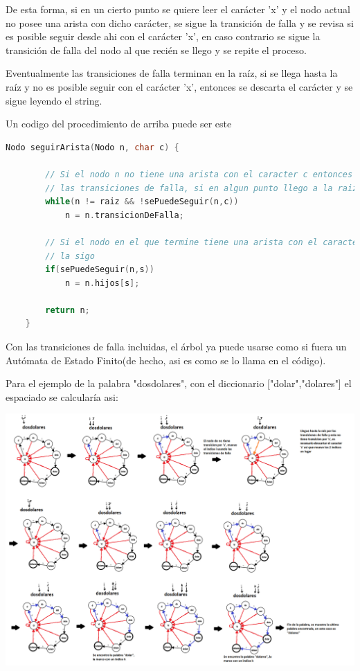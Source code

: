\documentclass{article}
\begin{document}
De esta forma, si en un cierto punto se quiere leer el carácter 'x' y el nodo actual no posee una arista con dicho carácter,
se sigue la transición de falla y se revisa si es posible seguir desde ahi con el carácter 'x', en caso contrario se sigue la transición de falla del nodo al que recién se llego y se repite el proceso.

Eventualmente las transiciones de falla terminan en la raíz, si se llega hasta la raíz y no es posible seguir con el carácter 'x', entonces se descarta el carácter y se sigue leyendo el string.

Un codigo del procedimiento de arriba puede ser este
\begin{lstlisting}[language=C]
    Nodo seguirArista(Nodo n, char c) {
        
        // Si el nodo n no tiene una arista con el caracter c entonces salto por
        // las transiciones de falla, si en algun punto llego a la raiz entonces paro.
        while(n != raiz && !sePuedeSeguir(n,c))
            n = n.transicionDeFalla;
        
        // Si el nodo en el que termine tiene una arista con el caracter s, entonces
        // la sigo
        if(sePuedeSeguir(n,s))
            n = n.hijos[s];
        
        return n;
    }
\end{lstlisting}

Con las transiciones de falla incluidas, el árbol ya puede usarse como si fuera un Autómata de Estado Finito(de hecho, asi es como se lo llama en el código).

Para el ejemplo de la palabra "dosdolares", con el diccionario ["dolar","dolares"] el espaciado se calcularía asi:

\begin{center}
\includegraphics[scale=0.3]{Imagenes/automata_falla_ejemplo_dosdolares.png}
\end{center}
\end{document}
